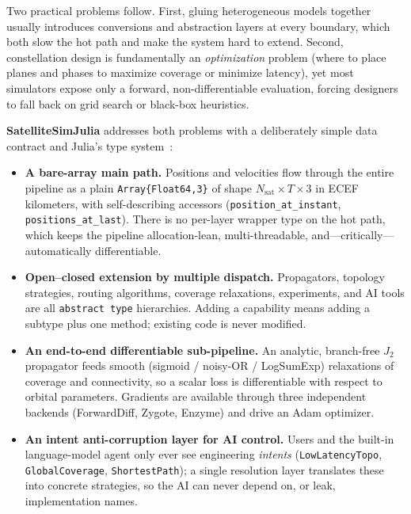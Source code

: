 \documentclass[10pt,twocolumn]{article}
\newcommand{\code}[1]{\texttt{\small #1}}
\begin{document}
Two practical problems follow. First, gluing heterogeneous models together
usually introduces conversions and abstraction layers at every boundary, which
both slow the hot path and make the system hard to extend. Second, constellation
design is fundamentally an \emph{optimization} problem (where to place planes and
phases to maximize coverage or minimize latency), yet most simulators expose only
a forward, non-differentiable evaluation, forcing designers to fall back on grid
search or black-box heuristics.

\textbf{SatelliteSimJulia} addresses both problems with a deliberately simple
data contract and Julia's type system~\cite{julia}:

\begin{itemize}
\item \textbf{A bare-array main path.} Positions and velocities flow through the
entire pipeline as a plain \code{Array\{Float64,3\}} of shape
$N_\text{sat}{\times}T{\times}3$ in ECEF kilometers, with self-describing
accessors (\code{position\_at\_instant}, \code{positions\_at\_last}). There is
no per-layer wrapper type on the hot path, which keeps the pipeline allocation-lean,
multi-threadable, and---critically---automatically differentiable.

\item \textbf{Open--closed extension by multiple dispatch.} Propagators, topology
strategies, routing algorithms, coverage relaxations, experiments, and AI tools
are all \code{abstract type} hierarchies. Adding a capability means adding a
subtype plus one method; existing code is never modified.

\item \textbf{An end-to-end differentiable sub-pipeline.} An analytic,
branch-free $J_2$ propagator feeds smooth (sigmoid / noisy-OR / LogSumExp)
relaxations of coverage and connectivity, so a scalar loss is differentiable with
respect to orbital parameters. Gradients are available through three independent
backends (ForwardDiff, Zygote, Enzyme) and drive an Adam optimizer.

\item \textbf{An intent anti-corruption layer for AI control.} Users and the
built-in language-model agent only ever see engineering \emph{intents}
(\code{LowLatencyTopo}, \code{GlobalCoverage}, \code{ShortestPath}); a single
resolution layer translates these into concrete strategies, so the AI can never
depend on, or leak, implementation names.
\end{itemize}
\end{document}

